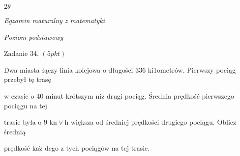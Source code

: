 \documentclass[a4paper,12pt]{article}
\begin{document}
$ 2\theta$

{\it Egzamin maturalny z matematyki}

{\it Poziom podstawowy}

Zadanie 34. $(5pkt)$

Dwa miasta łączy linia kolejowa o długości 336 ki1ometrów. Pierwszy pociąg przebył tę trasę

w czasie o 40 minut krótszym $\mathrm{n}\mathrm{i}\dot{\mathrm{z}}$ drugi pociąg. Średnia prędkość pierwszego pociągu na tej

trasie była o 9 $\mathrm{k}\mathrm{n}\vee \mathrm{h}$ większa od średniej prędkości drugiego pociągu. Oblicz średnią

prędkość $\mathrm{k}\mathrm{a}\dot{\mathrm{z}}$ dego z tych pociągów na tej trasie.
\end{document}
